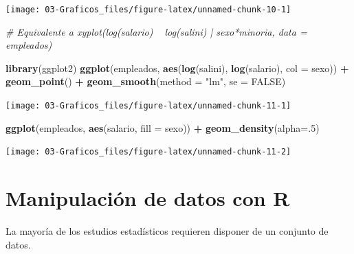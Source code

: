 \documentclass[]{book}
\newenvironment{Shaded}{\begin{snugshade}}{\end{snugshade}}
\newcommand{\CommentTok}[1]{\textcolor[rgb]{0.56,0.35,0.01}{\textit{#1}}}
\newcommand{\DataTypeTok}[1]{\textcolor[rgb]{0.13,0.29,0.53}{#1}}
\newcommand{\DecValTok}[1]{\textcolor[rgb]{0.00,0.00,0.81}{#1}}
\newcommand{\KeywordTok}[1]{\textcolor[rgb]{0.13,0.29,0.53}{\textbf{#1}}}
\newcommand{\NormalTok}[1]{#1}
\newcommand{\OperatorTok}[1]{\textcolor[rgb]{0.81,0.36,0.00}{\textbf{#1}}}
\newcommand{\OtherTok}[1]{\textcolor[rgb]{0.56,0.35,0.01}{#1}}
\newcommand{\StringTok}[1]{\textcolor[rgb]{0.31,0.60,0.02}{#1}}
\begin{document}
\begin{center}\texttt{[image: 03-Graficos\_files/figure-latex/unnamed-chunk-10-1]} \end{center}

\begin{Shaded}
\begin{Highlighting}[]
\CommentTok{# Equivalente a xyplot(log(salario) ~ log(salini) | sexo*minoria, data = empleados)}
\end{Highlighting}
\end{Shaded}

\begin{Shaded}
\begin{Highlighting}[]
\KeywordTok{library}\NormalTok{(ggplot2)}
\KeywordTok{ggplot}\NormalTok{(empleados, }\KeywordTok{aes}\NormalTok{(}\KeywordTok{log}\NormalTok{(salini), }\KeywordTok{log}\NormalTok{(salario), }\DataTypeTok{col =}\NormalTok{ sexo)) }\OperatorTok{+}
\StringTok{  }\KeywordTok{geom_point}\NormalTok{() }\OperatorTok{+}
\StringTok{  }\KeywordTok{geom_smooth}\NormalTok{(}\DataTypeTok{method =} \StringTok{"lm"}\NormalTok{, }\DataTypeTok{se =} \OtherTok{FALSE}\NormalTok{)}
\end{Highlighting}
\end{Shaded}

\begin{center}\texttt{[image: 03-Graficos\_files/figure-latex/unnamed-chunk-11-1]} \end{center}

\begin{Shaded}
\begin{Highlighting}[]
\KeywordTok{ggplot}\NormalTok{(empleados, }\KeywordTok{aes}\NormalTok{(salario, }\DataTypeTok{fill =}\NormalTok{ sexo)) }\OperatorTok{+}
\StringTok{  }\KeywordTok{geom_density}\NormalTok{(}\DataTypeTok{alpha=}\NormalTok{.}\DecValTok{5}\NormalTok{)}
\end{Highlighting}
\end{Shaded}

\begin{center}\texttt{[image: 03-Graficos\_files/figure-latex/unnamed-chunk-11-2]} \end{center}

\hypertarget{manipulacion-de-datos-con-r}{%
\chapter{Manipulación de datos con R}\label{manipulacion-de-datos-con-r}}

La mayoría de los estudios estadísticos
requieren disponer de un conjunto de datos.
\end{document}
